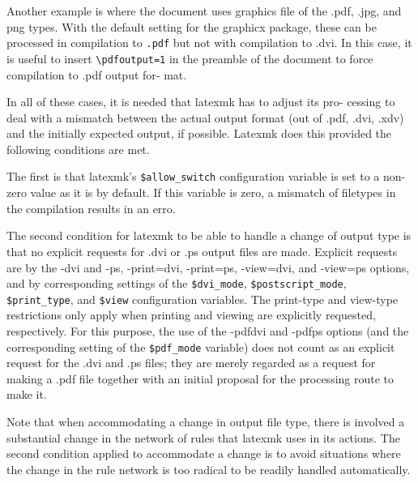 Another example is where the document uses graphics file of  the  .pdf, .jpg,
and  png types.  With the default setting for the graphicx package, these can
be processed in compilation to \verb|.pdf| but not with  compilation  to  .dvi.  In
this case, it is useful to insert \verb|\pdfoutput=1| in the preamble of the document
to force compilation to .pdf  output  for- mat.

In all of these cases, it is needed that latexmk has to adjust its pro-
cessing to deal with a mismatch between the actual output  format  (out
of  .pdf,  .dvi,  .xdv) and the initially expected output, if possible.
Latexmk does this provided the following conditions are met.

The first is that latexmk's \verb|$allow_switch| configuration variable is set to  a
non-zero value as it is by default.  If this variable is zero, a mismatch of
filetypes in the compilation results in an erro.

The second condition for latexmk to be able to handle a change of  output  type
is that no explicit requests for .dvi or .ps output files are made.   Explicit
requests  are  by  the  -dvi  and  -ps,   -print=dvi, -print=ps,  -view=dvi,
and -view=ps options, and by corresponding settings of the \verb|$dvi_mode|,
\verb|$postscript_mode|, \verb|$print_type|, and  \verb|$view|  configuration
variables.   The print-type and view-type restrictions only apply when printing
and viewing are explicitly requested, respectively.  For  this  purpose,  the
use of the -pdfdvi and -pdfps options (and the corresponding setting of the
\verb|$pdf_mode| variable) does not count  as  an explicit  request  for the
.dvi and .ps files; they are merely regarded as a request for making a .pdf
file together with an initial  proposal for the processing route to make it.

Note that when accommodating a change in output file type, there is involved a
substantial change in the network of rules that  latexmk  uses in  its
actions.  The second condition applied to accommodate a change is to avoid
situations where the change in the rule network is too radical to be readily
handled automatically.
  
